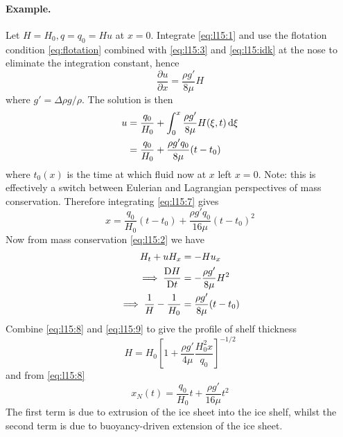 \documentclass{jknotes}
\begin{document}
\paragraph{Example.} Let $H = H_0, q = q_0 = Hu$ at $x=0$. Integrate
\eqref{eq:l15:1} and use the flotation condition \eqref{eq:flotation} combined
with \eqref{eq:l15:3} and \eqref{eq:l15:idk} at the nose to eliminate the
integration constant, hence
\begin{equation}
	\frac{\partial u}{\partial x} = \frac{\rho g'}{8\mu} H
\end{equation}
where $g' = \Delta \rho g/\rho$. The solution is then
\begin{align}
	u &= \frac{q_0}{H_0} + \int_0^x \frac{\rho g'}{8\mu} H(\xi, t) \, \diffd
	\xi \\
	  &= \frac{q_0}{H_0} + \frac{\rho g' q_0}{8\mu} (t-t_0) \label{eq:l15:7}
\end{align}
where $t_0(x)$ is the time at which fluid now at $x$ left $x=0$. Note: this is
effectively a switch between Eulerian and Lagrangian perspectives of mass
conservation. Therefore integrating \eqref{eq:l15:7} gives
\begin{equation}
	x = \frac{q_0}{H_0}(t-t_0) + \frac{\rho g' q_0}{16\mu} (t-t_0)^2
	\label{eq:l15:8}
\end{equation}
Now from mass conservation \eqref{eq:l15:2} we have
\begin{align}
	H_t + uH_x &= -Hu_x \\
	\implies \frac{\mathrm{D} H}{\mathrm{D} t} &= -\frac{\rho g'}{8\mu} H^2 \\
	\implies \frac{1}{H} -\frac{1}{H_0} &= \frac{\rho g'}{8\mu} (t-t_0)
	\label{eq:l15:9}
\end{align}
Combine \eqref{eq:l15:8} and \eqref{eq:l15:9} to give the profile of shelf
thickness
\begin{equation}
	H = H_0 \left[ 1+ \frac{\rho g'}{4\mu} \frac{H_0^2 x}{q_0}\right]^{-1/2}
\end{equation}
and from \eqref{eq:l15:8}
\begin{equation}
	x_N(t) = \frac{q_0}{H_0}t + \frac{\rho g'}{16\mu} t^2
\end{equation}
The first term is due to extrusion of the ice sheet into the ice shelf, whilst
the second term is due to buoyancy-driven extension of the ice sheet.
\end{document}
